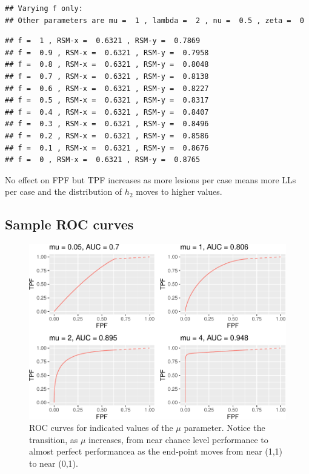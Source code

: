 \documentclass[
]{book}
\begin{document}
\begin{verbatim}
## Varying f only: 
## Other parameters are mu =  1 , lambda =  2 , nu =  0.5 , zeta =  0
\end{verbatim}

\begin{verbatim}
## f =  1 , RSM-x =  0.6321 , RSM-y =  0.7869 
## f =  0.9 , RSM-x =  0.6321 , RSM-y =  0.7958 
## f =  0.8 , RSM-x =  0.6321 , RSM-y =  0.8048 
## f =  0.7 , RSM-x =  0.6321 , RSM-y =  0.8138 
## f =  0.6 , RSM-x =  0.6321 , RSM-y =  0.8227 
## f =  0.5 , RSM-x =  0.6321 , RSM-y =  0.8317 
## f =  0.4 , RSM-x =  0.6321 , RSM-y =  0.8407 
## f =  0.3 , RSM-x =  0.6321 , RSM-y =  0.8496 
## f =  0.2 , RSM-x =  0.6321 , RSM-y =  0.8586 
## f =  0.1 , RSM-x =  0.6321 , RSM-y =  0.8676 
## f =  0 , RSM-x =  0.6321 , RSM-y =  0.8765
\end{verbatim}

No effect on FPF but TPF increases as more lesions per case means more LLs per case and the distribution of \(h_2\) moves to higher values.

\hypertarget{rsm-predictions-roc-curves}{%
\subsection{Sample ROC curves}\label{rsm-predictions-roc-curves}}

\begin{figure}
\centering
\includegraphics{07-rsm-predictions_files/figure-latex/rsm-predictions-fig-auc-mu-plots-1.pdf}
\caption{\label{fig:rsm-predictions-fig-auc-mu-plots}ROC curves for indicated values of the \(\mu\) parameter. Notice the transition, as \(\mu\) increases, from near chance level performance to almost perfect performancea as the end-point moves from near (1,1) to near (0,1).}
\end{figure}
\end{document}
